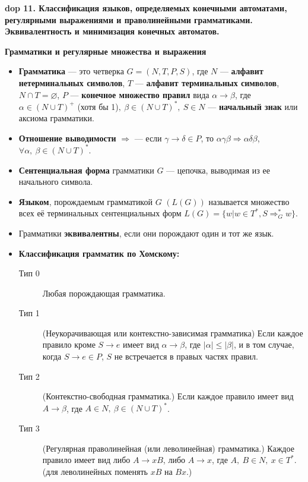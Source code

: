 \textbf{\LARGE dop 11. Классификация  языков,  определяемых  конечными  автоматами,  регулярными  выражениями  и праволинейными грамматиками. Эквивалентность и минимизация конечных автоматов.}

\textbf{Грамматики и регулярные множества и выражения}
\begin{itemize}
    \item \textbf{Грамматика} --- это четверка $G = (N, T, P, S)$, где $N$ --- \textbf{алфавит нетерминальных символов}, $T$ --- \textbf{алфавит терминальных символов}, $N \cap T = \varnothing$, $P$ --- \textbf{конечное множество правил} вида $\alpha \rightarrow \beta$, где $\alpha \in (N \cup T)^+$ (хотя бы 1)$,~\beta \in (N \cup T)^\ast,~S \in N$ --- \textbf{начальный знак} или аксиома грамматики.
    \item \textbf{Отношение выводимости} $\Rightarrow$ --- если $\gamma \rightarrow \delta \in P$, то $\alpha \gamma \beta \Rightarrow \alpha \delta \beta$, $\forall \alpha,~\beta \in (N \cup T)^\ast$.
    \item \textbf{Сентенциальная форма} грамматики $G$ --- цепочка, выводимая из ее начального символа.
    \item \textbf{Языком}, порождаемым грамматикой $G$ $(L(G))$ называется множество всех её терминальных сентенциальных форм $L(G) = \{ w |w \in T^\ast , S \Rightarrow^{\ast}_G w\}$.
    \item Грамматики \textbf{эквивалентны}, если они порождают один и тот же язык.
    \item \textbf{Классификация грамматик по Хомскому:}
    \begin{description}
        \item[Тип 0] Любая порождающая грамматика.
        \item[Тип 1] (Неукорачивающая или контекстно-зависимая грамматика) Если каждое правило кроме $S \rightarrow e$ имеет вид $\alpha \rightarrow \beta$, где $|\alpha| \leqslant |\beta|$, и в том случае, когда $S \rightarrow e \in P$, $S$ не встречается в правых частях правил.
        \item[Тип 2] (Контекстно-свободная грамматика.) Если каждое правило имеет вид $A \rightarrow \beta$, где $A \in N,~\beta \in (N \cup T)^\ast$.
        \item[Тип 3] (Регулярная праволинейная (или леволинейная) грамматика.) Каждое правило имеет вид либо $A \rightarrow xB$, либо $A \rightarrow x$, где $A,~B \in N,~x \in T^\ast$. (для леволинейных поменять $xB$ на $Bx$.)
    \end{description}

\end{itemize}

